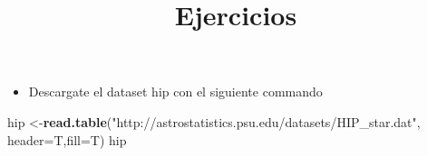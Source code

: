 \documentclass[]{article}
\title{Ejercicios}
\author{}
\date{}
\newenvironment{Shaded}{\begin{snugshade}}{\end{snugshade}}
\newcommand{\KeywordTok}[1]{\textcolor[rgb]{0.13,0.29,0.53}{\textbf{#1}}}
\newcommand{\DataTypeTok}[1]{\textcolor[rgb]{0.13,0.29,0.53}{#1}}
\newcommand{\StringTok}[1]{\textcolor[rgb]{0.31,0.60,0.02}{#1}}
\newcommand{\NormalTok}[1]{#1}
\providecommand{\tightlist}{%
  \setlength{\itemsep}{0pt}\setlength{\parskip}{0pt}}
\begin{document}
\maketitle

\begin{itemize}
\tightlist
\item
  Descargate el dataset hip con el siguiente commando
\end{itemize}

\begin{Shaded}
\begin{Highlighting}[]
\NormalTok{hip  <-}\KeywordTok{read.table}\NormalTok{(}\StringTok{"http://astrostatistics.psu.edu/datasets/HIP_star.dat"}\NormalTok{, }\DataTypeTok{header=}\NormalTok{T,}\DataTypeTok{fill=}\NormalTok{T)}
\NormalTok{hip}
\end{Highlighting}
\end{Shaded}
\end{document}

